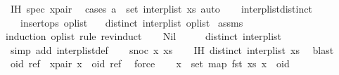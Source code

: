 \begin{isabellebody}
\ IH\ spec\ x{\isacharunderscore}pair\ \isamarkupfalse%
\ {\isacharparenleft}cases\ {\isachardoublequoteopen}a\ {\isasymin}\ set\ {\isacharparenleft}interp{\isacharunderscore}list\ xs{\isacharparenright}{\isachardoublequoteclose}{\isacharcomma}\ auto{\isacharparenright}\isanewline
\ \ \isamarkupfalse%
\isanewline
{}\isamarkupfalse%
%
\endisatagproof
{\isafoldproof}%
%
\isadelimproof
\isanewline
%
\endisadelimproof
\isanewline
{}\isamarkupfalse%
\ interp{\isacharunderscore}list{\isacharunderscore}distinct{\isacharcolon}\isanewline
\ \ \ {\isachardoublequoteopen}insert{\isacharunderscore}ops\ op{\isacharunderscore}list{\isachardoublequoteclose}\isanewline
\ \ \ {\isachardoublequoteopen}distinct\ {\isacharparenleft}interp{\isacharunderscore}list\ op{\isacharunderscore}list{\isacharparenright}{\isachardoublequoteclose}\isanewline
%
\isadelimproof
%
\endisadelimproof
%
\isatagproof
{}\isamarkupfalse%
\ assms\ \isamarkupfalse%
{\isacharparenleft}induction\ op{\isacharunderscore}list\ rule{\isacharcolon}\ rev{\isacharunderscore}induct{\isacharparenright}\isanewline
\ \ \isamarkupfalse%
\ Nil\isanewline
\ \ \isamarkupfalse%
\ \isamarkupfalse%
\ {\isachardoublequoteopen}distinct\ {\isacharparenleft}interp{\isacharunderscore}list\ {\isacharbrackleft}{\isacharbrackright}{\isacharparenright}{\isachardoublequoteclose}\isanewline
\ \ \ \ \isamarkupfalse%
\ {\isacharparenleft}simp\ add{\isacharcolon}\ interp{\isacharunderscore}list{\isacharunderscore}def{\isacharparenright}\isanewline
{}\isamarkupfalse%
\isanewline
\ \ \isamarkupfalse%
\ {\isacharparenleft}snoc\ x\ xs{\isacharparenright}\isanewline
\ \ \isamarkupfalse%
\ IH{\isacharcolon}\ {\isachardoublequoteopen}distinct\ {\isacharparenleft}interp{\isacharunderscore}list\ xs{\isacharparenright}{\isachardoublequoteclose}\ \isamarkupfalse%
\ blast\isanewline
\ \ \isamarkupfalse%
\ oid\ ref\ \ x{\isacharunderscore}pair{\isacharcolon}\ {\isachardoublequoteopen}x\ {\isacharequal}\ {\isacharparenleft}oid{\isacharcomma}\ ref{\isacharparenright}{\isachardoublequoteclose}\ \isamarkupfalse%
\ force\isanewline
\ \ \isamarkupfalse%
\ {\isachardoublequoteopen}{\isasymforall}x\ {\isasymin}\ set\ {\isacharparenleft}map\ fst\ xs{\isacharparenright}{\isachardot}\ x\ {\isacharless}\ oid{\isachardoublequoteclose}\isanewline

\end{isabellebody}
